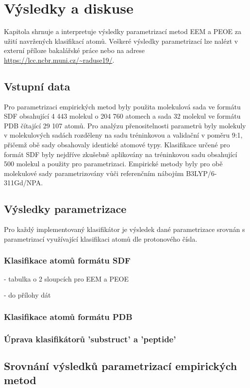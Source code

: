 \chapter{Výsledky a diskuse}
Kapitola shrnuje a interpretuje výsledky parametrizací metod EEM a PEOE za užití navržených klasifikací atomů. 
Veškeré výsledky parametrizací lze nalézt v externí příloze bakalářské práce nebo na adrese \url{https://lcc.ncbr.muni.cz/~raduse19/}.

\section{Vstupní data}
Pro parametrizaci empirických metod byly použita molekulová sada ve formátu SDF obsahující 4 443 molekul o 204 760 atomech a sada 32 molekul ve formátu PDB čítající 29 107 atomů. Pro analýzu přenositelnosti parametrů byly molekuly v molekulových sadách rozděleny na sadu tréninkovou a validační v poměru 9:1, přičemž obě sady obsahovaly identické atomové typy. Klasifikace určené pro formát SDF byly nejdříve zkušebně aplikovány na tréninkovou sadu obsahující 500 molekul a použity pro parametrizaci. Empirické metody byly pro obě molekulové sady parametrizovány vůči referenčním nábojům B3LYP/6-311Gd/NPA.

\section{Výsledky parametrizace}
Pro každý implementovaný klasifikátor je výsledek dané parametrizace srovnán s parametrizací využívající klasifikaci atomů dle protonového čísla. 


\subsection{Klasifikace atomů formátu SDF}
- tabulka o 2 sloupcích pro EEM a PEOE 

- do přílohy dát 
\subsection{Klasifikace atomů formátu PDB}
\subsection{Úprava klasifikátorů 'substruct' a 'peptide'}
\section{Srovnání výsledků parametrizací empirických metod}